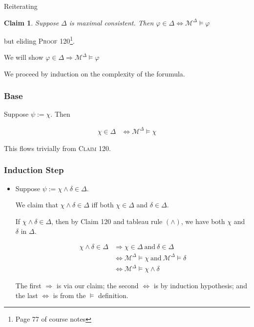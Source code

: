 \documentclass[a4paper]{article}
\newtheorem{claim}{Claim}
\newcommand{\MODEL}{\mathcal{M}}
\begin{document}
\begin{enumerate}
Reiterating

\begin{claim}
    Suppose $\Delta$ is maximal consistent. Then $\varphi \in \Delta \Leftrightarrow \MODEL^{\Delta} \models \varphi$
\end{claim}

but eliding \textsc{Proof 120}\footnote{Page 77 of course notes}.

We will show $\varphi \in \Delta \Rightarrow \MODEL^{\Delta} \models \varphi$

We proceed by induction on the complexity of the forumula.

\subsubsection*{Base}

Suppose $\psi := \chi$. Then

    \begin{align*}
        \chi \in \Delta & \Leftrightarrow \MODEL^{\Delta} \models \chi
    \end{align*}

    This flows trivially from \textsc{Claim 120}.

\subsubsection*{Induction Step}

\begin{itemize}

    \item Suppose $\psi := \chi \wedge \delta \in \Delta$. 
    
    We claim that $\chi \wedge \delta \in \Delta$ iff both $\chi \in \Delta$ and $\delta \in \Delta$. 

    If $\chi \wedge \delta \in \Delta$, then by Claim 120 and tableau rule $(\wedge)$, we have both $\chi$ and $\delta$ in $\Delta$.

    \begin{align*}
        \chi \wedge \delta \in \Delta & \Rightarrow  \chi \in \Delta\ \text{and} \ \delta \in \Delta\\
        & \Leftrightarrow \MODEL^{\Delta} \models \chi\ \text{and} \ \MODEL^{\Delta} \models \delta\\
        & \Leftrightarrow \MODEL^{\Delta} \models \chi \wedge \delta
    \end{align*}

    The first $\Rightarrow$ is via our claim; the second $\Leftrightarrow$ is by induction hypothesis; and the last $\Leftrightarrow$ is from the $\models$ definition.


\end{itemize}
\end{enumerate}
\end{document}
